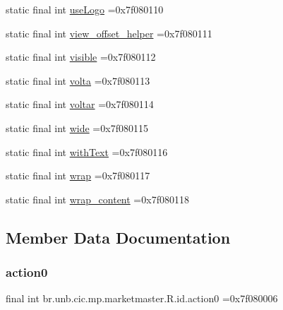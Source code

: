 \begin{DoxyCompactItemize}
\item 
static final int \mbox{\hyperlink{classbr_1_1unb_1_1cic_1_1mp_1_1marketmaster_1_1R_1_1id_afbed5f76bffafdf20c5b3839af4eb170}{use\+Logo}} =0x7f080110
\item 
static final int \mbox{\hyperlink{classbr_1_1unb_1_1cic_1_1mp_1_1marketmaster_1_1R_1_1id_a2e12c556af0153163fbe339d5f69eed3}{view\+\_\+offset\+\_\+helper}} =0x7f080111
\item 
static final int \mbox{\hyperlink{classbr_1_1unb_1_1cic_1_1mp_1_1marketmaster_1_1R_1_1id_ad2eee67e40fe52fd2dd02a45c6048001}{visible}} =0x7f080112
\item 
static final int \mbox{\hyperlink{classbr_1_1unb_1_1cic_1_1mp_1_1marketmaster_1_1R_1_1id_a608530379f141056d4987fc3a64f169b}{volta}} =0x7f080113
\item 
static final int \mbox{\hyperlink{classbr_1_1unb_1_1cic_1_1mp_1_1marketmaster_1_1R_1_1id_a18729bacda34df07d48b7880bee595f6}{voltar}} =0x7f080114
\item 
static final int \mbox{\hyperlink{classbr_1_1unb_1_1cic_1_1mp_1_1marketmaster_1_1R_1_1id_a14bb1b078a7c76c17030ec11635393bd}{wide}} =0x7f080115
\item 
static final int \mbox{\hyperlink{classbr_1_1unb_1_1cic_1_1mp_1_1marketmaster_1_1R_1_1id_a55184f442f57a6d9065f9d6ece6485e5}{with\+Text}} =0x7f080116
\item 
static final int \mbox{\hyperlink{classbr_1_1unb_1_1cic_1_1mp_1_1marketmaster_1_1R_1_1id_a3eba12730c80ea9b2a00503a67904445}{wrap}} =0x7f080117
\item 
static final int \mbox{\hyperlink{classbr_1_1unb_1_1cic_1_1mp_1_1marketmaster_1_1R_1_1id_a27dc0e14483f268bb7e3d7a199e8b08a}{wrap\+\_\+content}} =0x7f080118
\end{DoxyCompactItemize}


\subsection{Member Data Documentation}
\mbox{\label{classbr_1_1unb_1_1cic_1_1mp_1_1marketmaster_1_1R_1_1id_a1d0567a87d8677fe5f20bdfdfaa78dd0}} 
\subsubsection{\texorpdfstring{action0}{action0}}
{\footnotesize\ttfamily final int br.\+unb.\+cic.\+mp.\+marketmaster.\+R.\+id.\+action0 =0x7f080006\hspace{0.3cm}{\ttfamily [static]}}

